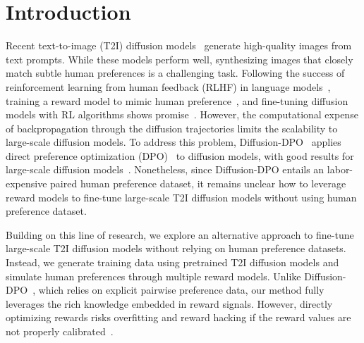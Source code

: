 \vspace{-0.2in}
\section{Introduction}
\label{sec:intro}

Recent text-to-image (T2I) diffusion models~\citep{saharia2022photorealistic, nichol2021glide, rombach2022high, esser2024scaling, betker2023improving} generate high-quality images from text prompts.
While these models perform well, synthesizing images that closely match subtle human preferences is a challenging task. 
Following the success of reinforcement learning from human feedback (RLHF) in language models~\citep{ouyang2022training}, training a reward model to mimic human preference~\citep{lee2023aligning, kirstain2023pick, xu2023imagereward, wu2023human, wu2023human2, zhang2024learning}, and fine-tuning diffusion models with RL algorithms shows promise~\citep{black2023training, fan2023dpok, deng2024prdp, lee2025parrot}. 
However, the computational expense of backpropagation through the diffusion trajectories limits the scalability to large-scale diffusion models. 
To address this problem, Diffusion-DPO~\citep{wallace2023diffusion} applies direct preference optimization (DPO)~\citep{rafailov2024direct} to diffusion models, with good results for large-scale diffusion models~\citep{esser2024scaling}. Nonetheless,
since Diffusion-DPO entails an labor-expensive paired human preference dataset,
it remains unclear how to leverage reward models to fine-tune large-scale T2I diffusion models without using human preference dataset.

Building on this line of research, we explore an alternative approach to fine-tune large-scale T2I diffusion models without relying on human preference datasets. Instead, we generate training data using pretrained T2I diffusion models and simulate human preferences through multiple reward models. Unlike Diffusion-DPO~\citep{wallace2023diffusion}, which relies on explicit pairwise preference data, our method fully leverages the rich knowledge embedded in reward signals. However, directly optimizing rewards risks overfitting and reward hacking if the reward values are not properly calibrated~\citep{gao2023scaling}.


